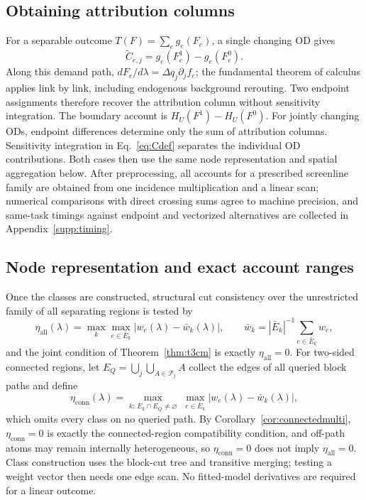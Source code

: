 \documentclass[a4paper,fleqn]{cas-sc}
\begin{document}
\subsection{Obtaining attribution columns}
For a separable outcome $T(F)=\sum_e g_e(F_e)$, a single changing OD gives
\begin{equation}
\widetilde C_{e,j}=g_e(F_e^1)-g_e(F_e^0).
\label{eq:edgeidentity}
\end{equation}
Along this demand path, $dF_e/d\lambda=\Delta q_j\partial_jf_e$; the fundamental theorem of calculus applies link by link, including endogenous background rerouting. Two endpoint assignments therefore recover the attribution column without sensitivity integration. The boundary account is $H_U(F^1)-H_U(F^0)$.
For jointly changing ODs, endpoint differences determine only the sum of attribution columns. Sensitivity integration in Eq.~\eqref{eq:Cdef} separates the individual OD contributions. Both cases then use the same node representation and spatial aggregation below. After preprocessing, all accounts for a prescribed screenline family are obtained from one incidence multiplication and a linear scan; numerical comparisons with direct crossing sums agree to machine precision, and same-task timings against endpoint and vectorized alternatives are collected in Appendix~\ref{supp:timing}.
\subsection{Node representation and exact account ranges}
Once the classes are constructed, structural cut consistency over the
unrestricted family of all separating regions is tested by
\begin{equation}
\eta_{\mathrm{all}}(\lambda)=\max_k\max_{e\in\bar E_k}|w_e(\lambda)-\bar w_k(\lambda)|,
\qquad
\bar w_k=|\bar E_k|^{-1}\sum_{e\in\bar E_k}w_e,
\label{eq:etaall}
\end{equation}
and the joint condition of Theorem~\ref{thm:t3cm} is exactly
$\eta_{\mathrm{all}}=0$. For two-sided connected regions, let
$E_Q=\bigcup_j\bigcup_{A\in\mathcal P_j}A$ collect the edges of all queried
block paths and define
\begin{equation}
\eta_{\mathrm{conn}}(\lambda)=
\max_{k:\,\bar E_k\cap E_Q\neq\varnothing}\;
\max_{e\in\bar E_k}|w_e(\lambda)-\bar w_k(\lambda)|,
\label{eq:etaconn}
\end{equation}
which omits every class on no queried path. By
Corollary~\ref{cor:connectedmulti}, $\eta_{\mathrm{conn}}=0$ is exactly the
connected-region compatibility condition, and off-path atoms may remain
internally heterogeneous, so $\eta_{\mathrm{conn}}=0$ does not imply
$\eta_{\mathrm{all}}=0$. Class construction uses the
block-cut tree and transitive merging; testing a weight vector then needs
one edge scan. No fitted-model derivatives are required for a linear outcome.
\end{document}

